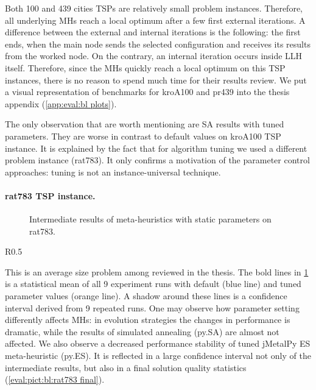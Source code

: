 Both 100 and 439 cities TSPs are relatively small problem instances. Therefore, all underlying MHs reach a local optimum after a few first external iterations. A difference between the external and internal iterations is the following: the first ends, when the main node sends the selected configuration and receives its results from the worked node. On the contrary, an internal iteration occurs inside LLH itself. Therefore, since the MHs quickly reach a local optimum on this TSP instances, there is no reason to spend much time for their results review. We put a visual representation of benchmarks for kroA100 and pr439 into the thesis appendix (\cref{app:eval:bl plots}).

The only observation that are worth mentioning are SA results with tuned parameters. They are worse in contrast to default values on kroA100 TSP instance. It is explained by the fact that for algorithm tuning we used a different problem instance (rat783). It only confirms a motivation of the parameter control approaches: tuning is not an instance-universal technique.

\paragraph{rat783 TSP instance.}
\begin{figure}[b]
	\centering
	\vspace{-20pt}
	
	\caption{Intermediate results of meta-heuristics with static parameters on rat783.}
	\vspace{-5pt}
	\label{eval:pict:bl:rat783 intermediate}
\end{figure}

\setlength{\columnsep}{5pt}%
\setlength{\intextsep}{5pt}%
\begin{wrapfigure}{R}{0.5\textwidth}%
	\centering
	
	\label{eval:pict:bl:rat783 final}
	\caption{Final results of meta-heuristics with static parameters on rat783.}
	\vspace{-10pt}
\end{wrapfigure}
This is an average size problem among reviewed in the thesis. The bold lines in \cref{eval:pict:bl:rat783 intermediate} is a statistical mean of all 9 experiment runs with default (blue line) and tuned parameter values (orange line). A shadow around these lines is a confidence interval derived from 9 repeated runs. One may observe how parameter setting differently affects MHs: in evolution strategies the changes in performance is dramatic, while the results of simulated annealing (py.SA) are almost not affected. We also observe a decreased performance stability of tuned jMetalPy ES meta-heuristic (py.ES). It is reflected in a large confidence interval not only of the intermediate results, but also in a final solution quality statistics (\cref{eval:pict:bl:rat783 final}).

